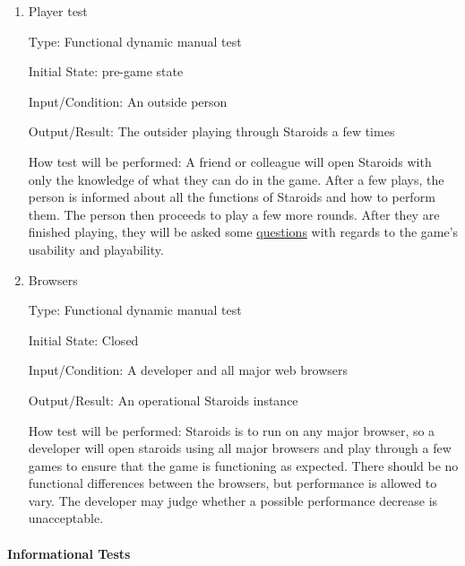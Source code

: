 \documentclass[12pt, titlepage]{article}
\begin{document}
\begin{enumerate}

\item{Player test\\}

Type: Functional dynamic manual test

Initial State: pre-game state

Input/Condition: An outside person

Output/Result: The outsider playing through Staroids a few times

How test will be performed: A friend or colleague will open Staroids with only the knowledge of what they can do in the game. After a few plays, the person is informed about all the functions of Staroids and how to perform them. The person then proceeds to play a few more rounds. After they are finished playing, they will be asked some \hyperref[interview:questions]{questions} with regards to the game's usability and playability.

\item{Browsers\\}

Type: Functional dynamic manual test

Initial State: Closed

Input/Condition: A developer and all major web browsers

Output/Result: An operational Staroids instance

How test will be performed: Staroids is to run on any major browser, so a developer will open staroids using all major browsers and play through a few games to ensure that the game is functioning as expected. There should be no functional differences between the browsers, but performance is allowed to vary. The developer may judge whether a possible performance decrease is unacceptable.

\end{enumerate}

\paragraph{Informational Tests}
\end{document}
